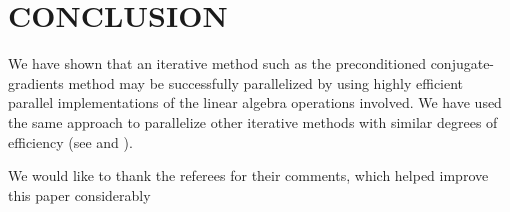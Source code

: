 \documentclass{ecai2014}
\begin{document}
\section{CONCLUSION}
We have shown that an iterative method such as the preconditioned
conjugate-gradients method may be successfully parallelized by using
highly efficient parallel implementations of the linear algebra
operations involved. We have used the same approach to parallelize
other iterative methods with similar degrees of efficiency (see
\cite{kn:daCunha92a} and \cite {kn:daCunha92b}).

\ack We would like to thank the referees for their comments, which
helped improve this paper considerably


\end{document}
